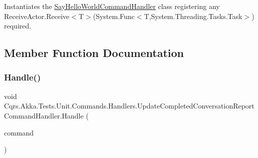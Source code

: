Instantiates the \hyperlink{classCqrs_1_1Akka_1_1Tests_1_1Unit_1_1Commands_1_1Handlers_1_1SayHelloWorldCommandHandler}{Say\+Hello\+World\+Command\+Handler} class registering any Receive\+Actor.\+Receive$<$\+T$>$(\+System.\+Func$<$\+T,\+System.\+Threading.\+Tasks.\+Task$>$) required. 



\subsection{Member Function Documentation}
\mbox{\label{classCqrs_1_1Akka_1_1Tests_1_1Unit_1_1Commands_1_1Handlers_1_1UpdateCompletedConversationReportCommandHandler_aecb596ab5c5e17823b93ac4fcae0e43e_aecb596ab5c5e17823b93ac4fcae0e43e}} 
\subsubsection{\texorpdfstring{Handle()}{Handle()}}
{\footnotesize\ttfamily void Cqrs.\+Akka.\+Tests.\+Unit.\+Commands.\+Handlers.\+Update\+Completed\+Conversation\+Report\+Command\+Handler.\+Handle (\begin{DoxyParamCaption}\item[{\hyperlink{classCqrs_1_1Akka_1_1Tests_1_1Unit_1_1Commands_1_1UpdateCompletedConversationReportCommand}{Update\+Completed\+Conversation\+Report\+Command}}]{command }\end{DoxyParamCaption})}



